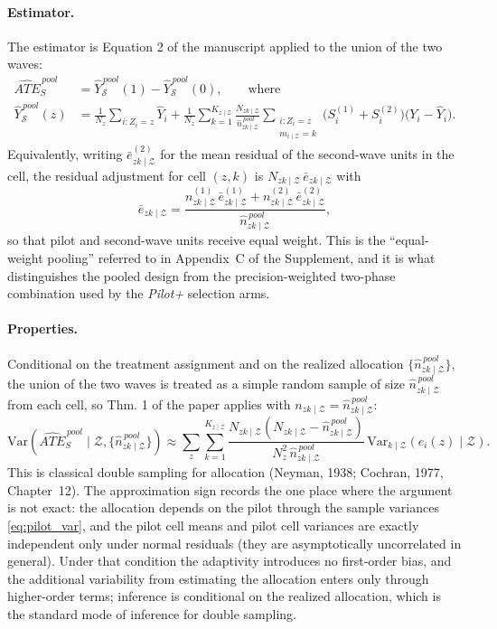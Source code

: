 \documentclass[12pt]{article}
\theoremstyle{remark}
\def\Var{\mbox{Var}}
\newcommand{\var}[1]{\Var \! \left ( #1 \right )}
\newcommand{\varkZ}[1]{\Var_{k \mid \mathcal{Z}} \! \left ( #1 \right )}
\newcommand{\NzkZ}{N_{zk \mid\mathcal{Z}}}
\newcommand{\nzkZ}{n_{zk \mid\mathcal{Z}}}
\newcommand{\npzkZ}{n^{(1)}_{zk \mid \mathcal{Z}}}
\newcommand{\nszkZ}{n^{(2)}_{zk \mid \mathcal{Z}}}
\newcommand{\npoolzkZ}{\hat{n}^{\,pool}_{zk \mid \mathcal{Z}}}
\newcommand{\yhatpool}[1]{\hat{Y}^{\,pool}_{\mathcal{S}}(#1)}
\newcommand{\atepool}{\widehat{ATE}_S^{\,pool}}
\newcommand{\cellsum}[1]{\sum_{\substack{i:Z_i=#1 \\ m_{i \mid \mathcal{Z}} = k}}}
\begin{document}
\paragraph{Estimator.} The estimator is Equation 2 of the manuscript applied to the union of the two waves:
\begin{equation}
\label{eq:pilot_pool_est}
\begin{aligned}
\atepool &= \yhatpool{1} - \yhatpool{0}, \qquad \text{where} \\
\yhatpool{z} &= \frac{1}{N_z} \sum_{i:Z_i=z} \hat{Y}_i
 + \frac{1}{N_z} \sum_{k=1}^{K_{z \mid \mathcal{Z}}} \frac{\NzkZ}{\npoolzkZ} \cellsum{z} \big( S^{(1)}_i + S^{(2)}_i \big) \big( Y_i - \hat{Y}_i \big).
\end{aligned}
\end{equation}
Equivalently, writing $\bar{e}^{(2)}_{zk \mid \mathcal{Z}}$ for the mean residual of the second-wave units in the cell, the residual adjustment for cell $(z,k)$ is $\NzkZ\, \bar{e}_{zk \mid \mathcal{Z}}$ with
\begin{equation}
\label{eq:pool_mean}
\bar{e}_{zk \mid \mathcal{Z}} = \frac{\npzkZ\, \bar{e}^{(1)}_{zk \mid \mathcal{Z}} + \nszkZ\, \bar{e}^{(2)}_{zk \mid \mathcal{Z}}}{\npoolzkZ} ,
\end{equation}
so that pilot and second-wave units receive equal weight. This is the ``equal-weight pooling'' referred to in Appendix~C of the Supplement, and it is what distinguishes the pooled design from the precision-weighted two-phase combination used by the \emph{Pilot+} selection arms.

\paragraph{Properties.} Conditional on the treatment assignment and on the realized allocation $\{\npoolzkZ\}$, the union of the two waves is treated as a simple random sample of size $\npoolzkZ$ from each cell, so Thm. 1 of the paper applies with $\nzkZ = \npoolzkZ$:
\begin{equation}
\label{eq:pool_var}
\var{\atepool \mid \mathcal{Z}, \{\npoolzkZ\}} \approx \sum_{z} \sum_{k=1}^{K_{z \mid \mathcal{Z}}} \frac{\NzkZ (\NzkZ - \npoolzkZ)}{N_z^2\, \npoolzkZ}\, \varkZ{e_i(z) \mid \mathcal{Z}} .
\end{equation}
This is classical double sampling for allocation (Neyman, 1938; Cochran, 1977, Chapter~12). The approximation sign records the one place where the argument is not exact: the allocation depends on the pilot through the sample variances \eqref{eq:pilot_var}, and the pilot cell means and pilot cell variances are exactly independent only under normal residuals (they are asymptotically uncorrelated in general). Under that condition the adaptivity introduces no first-order bias, and the additional variability from estimating the allocation enters only through higher-order terms; inference is conditional on the realized allocation, which is the standard mode of inference for double sampling.
\end{document}
